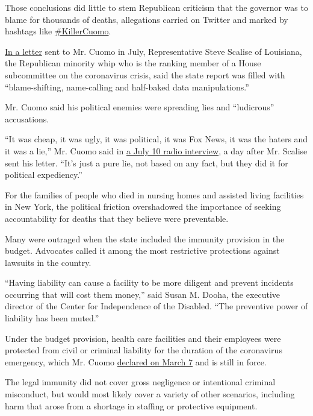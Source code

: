 Those conclusions did little to stem Republican criticism that the
governor was to blame for thousands of deaths, allegations carried on
Twitter and marked by hashtags like
\href{https://twitter.com/search?q=\%23KillerCuomo}{\#KillerCuomo}.

\href{https://republicans-oversight.house.gov/wp-content/uploads/2020/07/letter-to-Cuomo-about-NYSDOH-report-2.pdf}{In
a letter} sent to Mr. Cuomo in July, Representative Steve Scalise of
Louisiana, the Republican minority whip who is the ranking member of a
House subcommittee on the coronavirus crisis, said the state report was
filled with ``blame-shifting, name-calling and half-baked data
manipulations.''

Mr. Cuomo said his political enemies were spreading lies and
``ludicrous'' accusations.

``It was cheap, it was ugly, it was political, it was Fox News, it was
the haters and it was a lie,'' Mr. Cuomo said in
\href{https://soundcloud.com/nygovcuomo/governor-cuomo-is-a-guest-on-5}{a
July 10 radio interview}, a day after Mr. Scalise sent his letter.
``It's just a pure lie, not based on any fact, but they did it for
political expediency.''

For the families of people who died in nursing homes and assisted living
facilities in New York, the political friction overshadowed the
importance of seeking accountability for deaths that they believe were
preventable.

Many were outraged when the state included the immunity provision in the
budget. Advocates called it among the most restrictive protections
against lawsuits in the country.

``Having liability can cause a facility to be more diligent and prevent
incidents occurring that will cost them money,'' said Susan M. Dooha,
the executive director of the Center for Independence of the Disabled.
``The preventive power of liability has been muted.''

Under the budget provision, health care facilities and their employees
were protected from civil or criminal liability for the duration of the
coronavirus emergency, which Mr. Cuomo
\href{https://www.nytimes.com/2020/03/07/nyregion/coronavirus-new-york-queens.html?searchResultPosition=1}{declared
on March 7} and is still in force.

The legal immunity did not cover gross negligence or intentional
criminal misconduct, but would most likely cover a variety of other
scenarios, including harm that arose from a shortage in staffing or
protective equipment.

